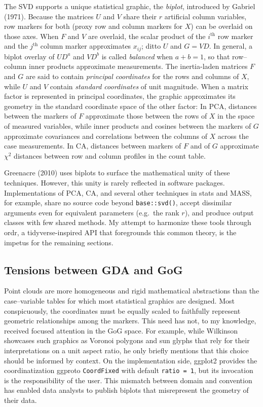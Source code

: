 \documentclass[
]{article}
\begin{document}
The SVD supports a unique statistical graphic, the \emph{biplot},
introduced by Gabriel (1971). Because the matrices \(U\) and \(V\) share
their \(r\) artificial column variables, row markers for both (proxy row
and column markers for \(X\)) can be overlaid on those axes. When \(F\)
and \(V\) are overlaid, the scalar product of the \(i^\text{th}\) row
marker and the \(j^\text{th}\) column marker approximates \(x_{ij}\);
ditto \(U\) and \(G = VD\). In general, a biplot overlay of \(UD^a\) and
\(VD^b\) is called \emph{balanced} when \(a + b = 1\), so that
row--column inner products approximate measurements. The inertia-laden
matrices \(F\) and \(G\) are said to contain \emph{principal
coordinates} for the rows and columns of \(X\), while \(U\) and \(V\)
contain \emph{standard coordinates} of unit magnitude. When a matrix
factor is represented in principal coordinates, the graphic approximates
its geometry in the standard coordinate space of the other factor: In
PCA, distances between the markers of \(F\) approximate those between
the rows of \(X\) in the space of measured variables, while inner
products and cosines between the markers of \(G\) approximate
covariances and correlations between the columns of \(X\) across the
case measurements. In CA, distances between markers of \(F\) and of
\(G\) approximate \(\chi^2\) distances between row and column profiles
in the count table.

Greenacre (2010) uses biplots to surface the mathematical unity of these
techniques. However, this unity is rarely reflected in software
packages. Implementations of PCA, CA, and several other techniques in
\textsf{stats} and \textsf{MASS}, for example, share no source code
beyond \texttt{base::svd()}, accept dissimilar arguments even for
equivalent parameters (e.g.~the rank \(r\)), and produce output classes
with few shared methods. My attempt to harmonize these tools through
\textsf{ordr}, a tidyverse-inspired API that foregrounds this common
theory, is the impetus for the remaining sections.

\subsection{Tensions between GDA and
GoG}\label{tensions-between-gda-and-gog}

Point clouds are more homogeneous and rigid mathematical abstractions
than the case--variable tables for which most statistical graphics are
designed. Most conspicuously, the coordinates must be equally scaled to
faithfully represent geometric relationships among the markers. This
need has not, to my knowledge, received focused attention in the GoG
space. For example, while Wilkinson showcases such graphics as Voronoi
polygons and sun glyphs that rely for their interpretations on a unit
aspect ratio, he only briefly mentions that this choice should be
informed by context. On the implementation side, \textsf{ggplot2}
provides the coordinatization ggproto \texttt{CoordFixed} with default
\texttt{ratio\ =\ 1}, but its invocation is the responsibility of the
user. This mismatch between domain and convention has enabled data
analysts to publish biplots that misrepresent the geometry of their
data.
\end{document}
